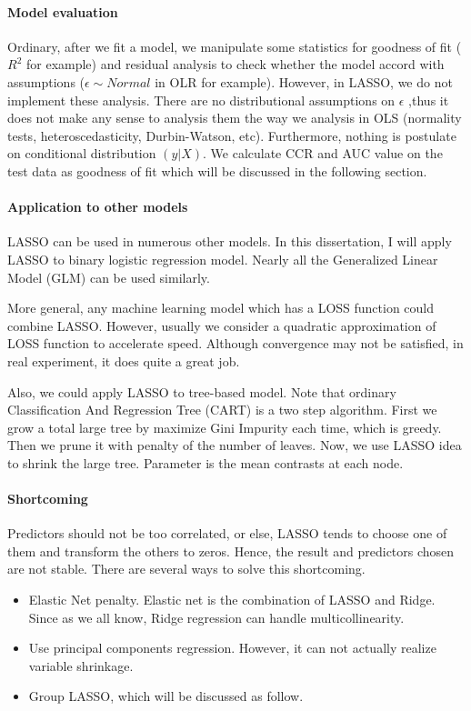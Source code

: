 \documentclass[]{article}
\begin{document}
\paragraph{Model evaluation}
Ordinary, after we fit a model, we manipulate some statistics for goodness of fit ($R^2$ for example) and residual analysis to check whether the model accord with assumptions ($\epsilon\sim Normal$ in OLR for example). However, in LASSO, we do not implement these analysis. There are no distributional assumptions on $\epsilon$ ,thus it does not make any sense to analysis them the way we analysis in OLS (normality tests, heteroscedasticity, Durbin-Watson, etc). Furthermore, nothing is postulate on conditional distribution $ (y|X) $. We calculate CCR and AUC value on the test data as goodness of fit which will be discussed in the following section.
\paragraph{Application to other models}
LASSO can be used in numerous other models. In this dissertation, I will apply LASSO to binary logistic regression model. Nearly all the Generalized Linear Model (GLM)\cite{mccullagh1984generalized} can be used similarly.

More general, any machine learning model which has a LOSS function could combine LASSO. However, usually we consider a quadratic approximation of LOSS function to accelerate speed. Although convergence may not be satisfied, in real experiment, it does quite a great job.

Also, we could apply LASSO to tree-based model. Note that ordinary Classification And Regression Tree (CART) is a two step algorithm. First we grow a total large tree by maximize Gini Impurity\cite{kurt2008comparing} each time, which is greedy. Then we prune it with penalty of the number of leaves. Now, we use LASSO idea to shrink the large tree. Parameter is the mean contrasts at each node\cite{kim2010tree}.

\paragraph{Shortcoming}
Predictors should not be too correlated, or else, LASSO tends to choose one of them and transform the others to zeros. Hence, the result and predictors chosen are not stable. There are several ways to solve this shortcoming.
\begin{itemize}
	\item Elastic Net penalty. Elastic net is the combination of LASSO and Ridge. Since as we all know, Ridge regression can handle multicollinearity.
	\item Use principal components regression\cite{chang2001near}. However, it can not actually realize variable shrinkage.
	\item Group LASSO, which will be discussed as follow.
\end{itemize}
\end{document}

